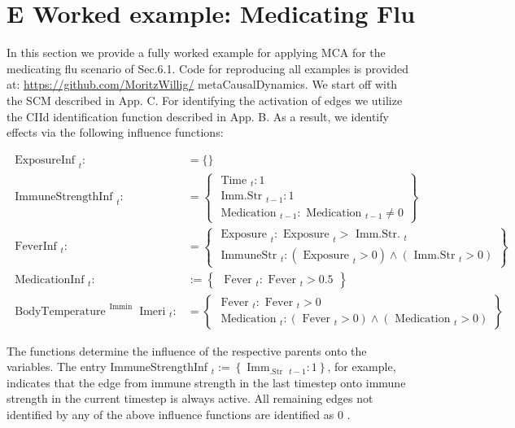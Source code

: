 \documentclass[10pt]{article}
\begin{document}
\section*{E Worked example: Medicating Flu}
In this section we provide a fully worked example for applying MCA for the medicating flu scenario of Sec.6.1. Code for reproducing all examples is provided at: \href{https://github.com/MoritzWillig/}{https://github.com/MoritzWillig/} metaCausalDynamics. We start off with the SCM described in App. C. For identifying the activation of edges we utilize the CIId identification function described in App. B. As a result, we identify effects via the following influence functions:


\begin{align*}
\text { ExposureInf }_{t}: & =\{ \}  \tag{20}\\
\text { ImmuneStrengthInf }_{t}: & =\left\{\begin{array}{c}
\text { Time }_{t}: 1 \\
\text { Imm.Str }_{t-1}: 1 \\
\text { Medication }_{t-1}: \text { Medication }_{t-1} \neq 0
\end{array}\right\}  \tag{21}\\
\text { FeverInf }_{t}: & =\left\{\begin{array}{cl}
\text { Exposure }_{t}: \text { Exposure }_{t}>\text { Imm.Str. }_{t} \\
\text { ImmuneStr }_{t}:\left(\text { Exposure }_{t}>0\right) \wedge\left(\text { Imm.Str }_{t}>0\right)
\end{array}\right\}  \tag{22}\\
\text { MedicationInf }_{t}: & :=\left\{\begin{array}{cl}
\text { Fever }_{t}: \text { Fever }_{t}>0.5
\end{array}\right\}  \tag{23}\\
\text { BodyTemperature }^{\text {Immin }} \text { Imeri }_{t}: & =\left\{\begin{array}{cl}
\text { Fever }_{t}: \text { Fever }_{t}>0 \\
\text { Medication }_{t}:\left(\text { Fever }_{t}>0\right) \wedge\left(\text { Medication }_{t}>0\right)
\end{array}\right\} \tag{24}
\end{align*}


The functions determine the influence of the respective parents onto the variables. The entry ImmuneStrengthInf ${ }_{t}:=\left\{\operatorname{Imm}_{\text {.Str }}{ }_{t-1}: 1\right\}$, for example, indicates that the edge from immune strength in the last timestep onto immune strength in the current timestep is always active. All remaining edges not identified by any of the above influence functions are identified as 0 .
\end{document}
